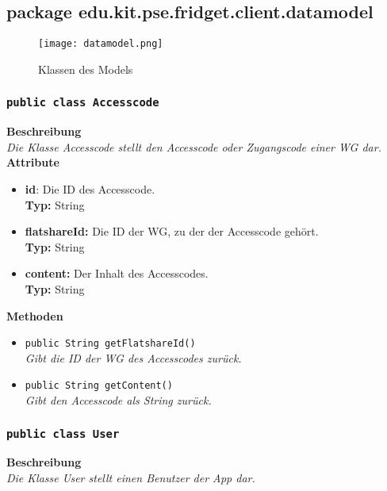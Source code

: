 \subsection{package edu.kit.pse.fridget.client.datamodel}
\begin{figure}[H]
	       \centering
	       \texttt{[image: datamodel.png]}
	       \caption{Klassen des Models}
	      \end{figure}
\subsubsection{\texttt{public class Accesscode}}

	\textbf{Beschreibung} \\
	\textit{Die Klasse Accesscode stellt den Accesscode oder Zugangscode einer WG dar.} \\
	
	\textbf{Attribute}
	\begin{itemize}
		\item \textbf{id}: Die ID des Accesscode. \\
		\textbf{Typ:} String
		
		\item \textbf{flatshareId:} Die ID der WG, zu der der Accesscode gehört. \\
		\textbf{Typ:} String

		\item \textbf{content:} Der Inhalt des Accesscodes.\\
		\textbf{Typ:} String
	\end{itemize}

	\textbf{Methoden}
	\begin{itemize}
		\item{\texttt{public String getFlatshareId()}}\\
		\textit{Gibt die ID der WG des Accesscodes zurück.}\\
		\item{\texttt{public String getContent()}}\\
		\textit{Gibt den Accesscode als String zurück.}\\
	\end{itemize}

	

\subsubsection{\texttt{public class User}}

	\textbf{Beschreibung} \\
	\textit{Die Klasse User stellt einen Benutzer der App dar.}\\
	

